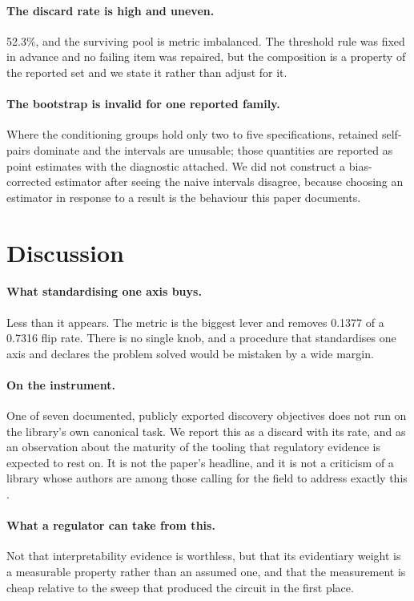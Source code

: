 \documentclass[11pt]{article}
\begin{document}
\paragraph{The discard rate is high and uneven.} 52.3\%, and the surviving pool is
metric imbalanced. The threshold rule was fixed in advance and no failing item was
repaired, but the composition is a property of the reported set and we state it
rather than adjust for it.

\paragraph{The bootstrap is invalid for one reported family.} Where the
conditioning groups hold only two to five specifications, retained self-pairs
dominate and the intervals are unusable; those quantities are reported as point
estimates with the diagnostic attached. We did not construct a bias-corrected
estimator after seeing the naive intervals disagree, because choosing an estimator
in response to a result is the behaviour this paper documents.

\section{Discussion}

\paragraph{What standardising one axis buys.} Less than it appears. The metric is
the biggest lever and removes 0.1377 of a 0.7316 flip rate. There is no single
knob, and a procedure that standardises one axis and declares the problem solved
would be mistaken by a wide margin.

\paragraph{On the instrument.} One of seven documented, publicly exported
discovery objectives does not run on the library's own canonical task. We report
this as a discard with its rate, and as an observation about the maturity of the
tooling that regulatory evidence is expected to rest on. It is not the paper's
headline, and it is not a criticism of a library whose authors are among those
calling for the field to address exactly this \citep{sharkey2025}.

\paragraph{What a regulator can take from this.} Not that interpretability
evidence is worthless, but that its evidentiary weight is a measurable property
rather than an assumed one, and that the measurement is cheap relative to the
sweep that produced the circuit in the first place.
\end{document}
